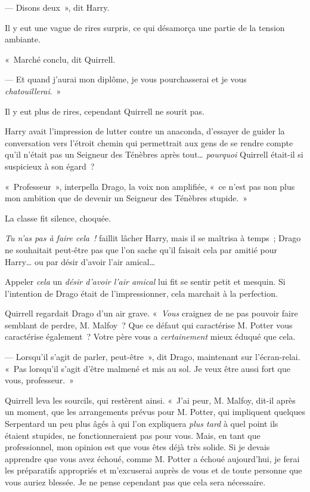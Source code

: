 --- Disons deux~», dit Harry.

Il y eut une vague de rires surpris, ce qui désamorça une partie de la tension ambiante.

«~Marché conclu, dit Quirrell.

--- Et quand j'aurai mon diplôme, je vous pourchasserai et je vous \emph{chatouillerai}.~»

Il y eut plus de rires, cependant Quirrell ne sourit pas.

Harry avait l'impression de lutter contre un anaconda, d'essayer de guider la conversation vers l'étroit chemin qui permettrait aux gens de se rendre compte qu'il n'était pas un Seigneur des Ténèbres après tout…
\emph{pourquoi} Quirrell était-il si suspicieux à son égard~?

«~Professeur~», interpella Drago, la voix non amplifiée, «~ce n'est pas non plus mon ambition que de devenir un Seigneur des Ténèbres stupide.~»

La classe fit silence, choquée.

\emph{Tu n'as pas à faire cela~!} faillit lâcher Harry, mais il se maîtrisa à temps~;
Drago ne souhaitait peut-être pas que l'on sache qu'il faisait cela par amitié pour Harry… ou par désir d'avoir l'air amical…

Appeler \emph{cela} un \emph{désir d'avoir l'air amical} lui fit se sentir petit et mesquin.
Si l'intention de Drago était de l'impressionner, cela marchait à la perfection.

Quirrell regardait Drago d'un air grave.
«~\emph{Vous} craignez de ne pas pouvoir faire semblant de perdre, M. Malfoy~?
Que ce défaut qui caractérise M. Potter vous caractérise également~?
Votre père vous a \emph{certainement} mieux éduqué que cela.

--- Lorsqu'il s'agit de parler, peut-être~», dit Drago, maintenant sur l'écran-relai.
«~Pas lorsqu'il s'agit d'être malmené et mis au sol.
Je veux être aussi fort que vous, professeur.~»

Quirrell leva les sourcils, qui restèrent ainsi.
«~J'ai peur, M. Malfoy, dit-il après un moment, que les arrangements prévus pour M. Potter, qui impliquent quelques Serpentard un peu plus âgés à qui l'on expliquera \emph{plus tard} à quel point ils étaient stupides, ne fonctionneraient pas pour vous.
Mais, en tant que professionnel, mon opinion est que vous êtes déjà très solide.
Si je devais apprendre que vous avez échoué, comme M. Potter a échoué aujourd'hui, je ferai les préparatifs appropriés et m'excuserai auprès de vous et de toute personne que vous auriez blessée.
Je ne pense cependant pas que cela sera nécessaire.

